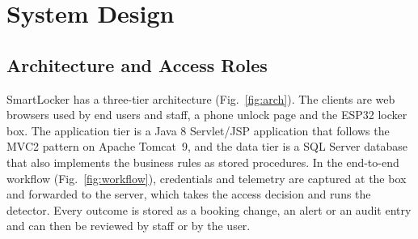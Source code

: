 \documentclass[journal,onecolumn]{IEEEtran}
\begin{document}
\section{System Design}

\subsection{Architecture and Access Roles}

SmartLocker has a three-tier architecture (Fig.~\ref{fig:arch}). The clients are web browsers used by end users and
staff, a phone unlock page and the ESP32 locker box. The application tier is a Java 8 Servlet/JSP application that
follows the MVC2 pattern on Apache Tomcat~9, and the data tier is a SQL Server database that also implements the
business rules as stored procedures. In the end-to-end workflow (Fig.~\ref{fig:workflow}), credentials and telemetry
are captured at the box and forwarded to the server, which takes the access decision and runs the detector. Every
outcome is stored as a booking change, an alert or an audit entry and can then be reviewed by staff or by the user.
\end{document}
